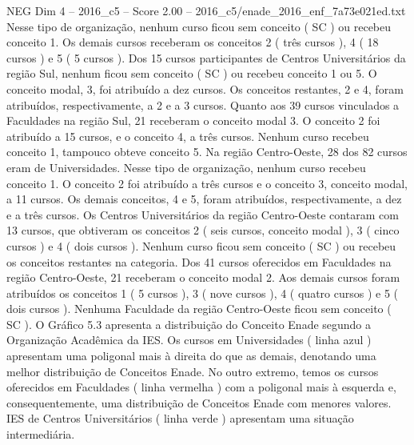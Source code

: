 \begin{textsample}{NEG Dim 4 – 2016\_c5 – Score 2.00 – 2016\_c5/enade\_2016\_enf\_7a73e021ed.txt}
Nesse tipo de organização, nenhum curso ficou sem conceito ( SC ) ou recebeu conceito 1.
Os demais cursos receberam os conceitos 2 ( três cursos ), 4 ( 18 cursos ) e 5 ( 5 cursos ).
Dos 15 cursos participantes de Centros Universitários da região Sul, nenhum ficou sem conceito ( SC ) ou recebeu conceito 1 ou 5.
O conceito modal, 3, foi atribuído a dez cursos.
Os conceitos restantes, 2 e 4, foram atribuídos, respectivamente, a 2 e a 3 cursos.
Quanto aos 39 cursos vinculados a Faculdades na região Sul, 21 receberam o conceito modal 3.
O conceito 2 foi atribuído a 15 cursos, e o conceito 4, a três cursos.
Nenhum curso recebeu conceito 1, tampouco obteve conceito 5.
Na região Centro-Oeste, 28 dos 82 cursos eram de Universidades.
Nesse tipo de organização, nenhum curso recebeu conceito 1.
O conceito 2 foi atribuído a três cursos e o conceito 3, conceito modal, a 11 cursos.
Os demais conceitos, 4 e 5, foram atribuídos, respectivamente, a dez e a três cursos.
Os Centros Universitários da região Centro-Oeste contaram com 13 cursos, que obtiveram os conceitos 2 ( seis cursos, conceito modal ), 3 ( cinco cursos ) e 4 ( dois cursos ).
Nenhum curso ficou sem conceito ( SC ) ou recebeu os conceitos restantes na categoria.
Dos 41 cursos oferecidos em Faculdades na região Centro-Oeste, 21 receberam o conceito modal 2.
Aos demais cursos foram atribuídos os conceitos 1 ( 5 cursos ), 3 ( nove cursos ), 4 ( quatro cursos ) e 5 ( dois cursos ).
Nenhuma Faculdade da região Centro-Oeste ficou sem conceito ( SC ).
O Gráfico 5.3 apresenta a distribuição do Conceito Enade segundo a Organização Acadêmica da IES.
Os cursos em Universidades ( linha azul ) apresentam uma poligonal mais à direita do que as demais, denotando uma melhor distribuição de Conceitos Enade.
No outro extremo, temos os cursos oferecidos em Faculdades ( linha vermelha ) com a poligonal mais à esquerda e, consequentemente, uma distribuição de Conceitos Enade com menores valores.
IES de Centros Universitários ( linha verde ) apresentam uma situação intermediária.

\end{textsample}
